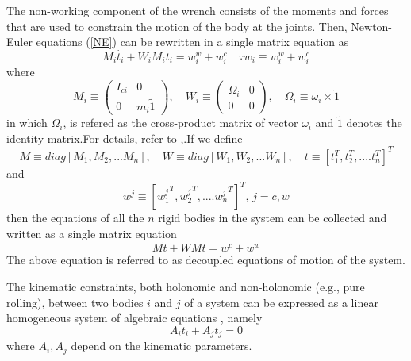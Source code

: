   The non-working component of the wrench consists of the moments and forces that are used to constrain the motion of the body at the joints.
Then, Newton-Euler equations (\ref{NE}) can be rewritten  in a single matrix equation as 
\begin{equation}
\label{2}
M_i\dot{t_i}+W_iM_it_i=w^w_i+w^c_i \quad \because w_i \equiv w^w_i+w^c_i
\end{equation}
where
\begin{equation}
\label{3}
M_i \equiv \begin{pmatrix}
I_{ci} & 0\\0 & m_i\tilde{1}
\end{pmatrix} ,
\quad W_i\equiv \begin{pmatrix}
\Omega_i &0\\0&0
\end{pmatrix},
\quad
\Omega_i\equiv \omega_i\times \tilde{1}
\end{equation}
in which  $\Omega_i$, is refered as the cross-product matrix of vector $\omega_i$ and $\tilde{1}$ denotes the identity matrix.For details, refer to \cite{angeles2013fundamentals},\cite{saha2010robotics}.If we define 
\[M \equiv diag[M_1,M_2,...M_n], \quad W \equiv diag[W_1,W_2,...W_n], \quad t \equiv [t_1^T,t_2^T, ....t_n^T]^T\] 
and 
\[ w^j \equiv [{w_1^j}^T,{w_2^j}^T, ....{w_n^j}^T]^T, \,j=c,w \]
then the equations of all the $n$ rigid bodies in the system can be collected and written as a single matrix equation 
\begin{equation}
\label{DCE}
M\dot{t}+WMt=w^c+w^w
\end{equation}
 The above equation is referred to as  decoupled equations of motion of the system.



The kinematic constraints, both holonomic and non-holonomic (e.g., pure rolling), between two bodies $i$ and $j$ of a system can be expressed as a linear homogeneous system of algebraic equations \cite{angeles2013fundamentals}, namely 
\begin{equation}
A_it_i+A_jt_j=0
\end{equation}
where $A_i,A_j$ depend on the kinematic parameters.

